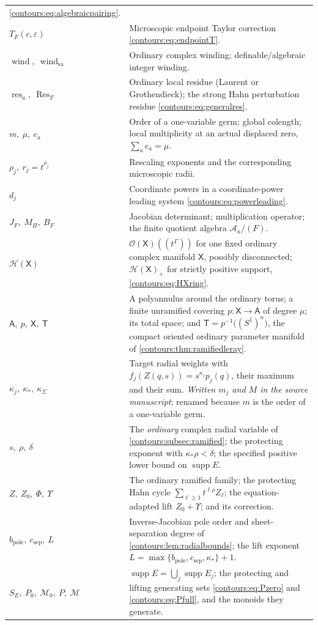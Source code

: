 \documentclass[11pt,letterpaper]{article}
\theoremstyle{definition}
\theoremstyle{remark}
\newcommand{\HH}{\mathcal H}\newcommand{\A}{\mathscr A}\newcommand{\OO}{\mathcal O}
\newcommand{\supp}{\operatorname{supp}}\newcommand{\Res}{\operatorname{Res}}
\newcommand{\res}{\operatorname{res}}\newcommand{\wind}{\operatorname{wind}}
\numberwithin{equation}{section}
\begin{document}
\begin{center}
\begin{longtable}{@{}L{0.26\textwidth}L{0.66\textwidth}@{}}
  \eqref{contours:eq:algebraicpairing}.\\[0.35em]
$T_F(c,\varepsilon)$ & Microscopic endpoint Taylor correction
  \eqref{contours:eq:endpointT}.\\[0.35em]
$\wind,\ \wind_{\mathrm{sa}}$ & Ordinary complex winding; definable/algebraic integer
  winding.\\[0.35em]
$\res_a,\ \Res_F$ & Ordinary local residue (Laurent or Grothendieck); the strong Hahn
  perturbation residue \eqref{contours:eq:generalres}.\\[0.35em]
$m,\ \mu,\ e_a$ & Order of a one-variable germ; global colength; local multiplicity at
  an actual displaced zero, $\sum_ae_a=\mu$.\\[0.35em]
$\rho_j,\ r_j=t^{\rho_j}$ & Rescaling exponents and the corresponding microscopic
  radii.\\[0.35em]
$d_j$ & Coordinate powers in a coordinate-power leading system
  \eqref{contours:eq:powerleading}.\\[0.35em]
$J_F,\ M_H,\ B_F$ & Jacobian determinant; multiplication operator; the finite quotient
  algebra $\A_n/(F)$.\\[0.35em]
$\HH(\mathsf X)$ & $\OO(\mathsf X)((t^\Gamma))$ for one fixed ordinary complex
  manifold $\mathsf X$, possibly disconnected; $\HH(\mathsf X)_+$ for strictly
  positive support, \eqref{contours:eq:HXring}.\\[0.35em]
$\mathsf A,\ p,\ \mathsf X,\ \mathsf T$ & A polyannulus around the ordinary
  torus; a finite unramified covering $p:\mathsf X\to\mathsf A$ of degree $\mu$;
  its total space; and $\mathsf T=p^{-1}\bigl((S^1)^n\bigr)$, the compact
  oriented ordinary parameter manifold of
  \cref{contours:thm:ramifiedleray}.\\[0.35em]
$\kappa_j,\ \kappa_*,\ \kappa_\Sigma$ & Target radial weights with
  $f_j(Z(q,s))=s^{\kappa_j}p_j(q)$, their maximum and their sum. \emph{Written
  $m_j$ and $M$ in the source manuscript}; renamed because $m$ is the order of a
  one-variable germ.\\[0.35em]
$s,\ \rho,\ \delta$ & The \emph{ordinary} complex radial variable of
  \cref{contours:subsec:ramified}; the protecting exponent with
  $\kappa_*\rho<\delta$; the specified positive lower bound on
  $\supp E$.\\[0.35em]
$Z,\ Z_0,\ \Phi,\ \Upsilon$ & The ordinary ramified family; the protecting Hahn
  cycle $\sum_{\ell\ge1}t^{\ell\rho}Z_\ell$; the equation-adapted lift
  $Z_0+\Upsilon$; and its correction.\\[0.35em]
$b_{\mathrm{pole}},\ c_{\mathrm{sep}},\ L$ & Inverse-Jacobian pole order and
  sheet-separation degree of \cref{contours:lem:radialbounds}; the lift exponent
  $L=\max\{b_{\mathrm{pole}},c_{\mathrm{sep}},\kappa_*\}+1$.\\[0.35em]
$S_E,\ P_0,\ \mathcal M_0,\ P,\ \mathcal M$ & $\supp E=\bigcup_j\supp E_j$; the
  protecting and lifting generating sets \eqref{contours:eq:Pzero} and
  \eqref{contours:eq:Pfull}, and the monoids they generate.\\
\bottomrule
\end{longtable}
\end{center}
\end{document}
